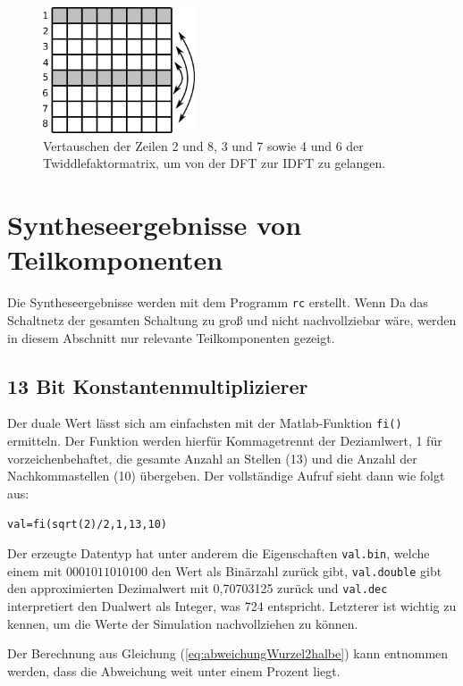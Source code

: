 \begin{figure}[ht]
 \centering
 \includegraphics[width=0.4\textwidth]{img/IDFT_Zeilentausch.png}
 \caption{Vertauschen der Zeilen 2 und 8, 3 und 7 sowie 4 und 6 der Twiddlefaktormatrix, um von der DFT zur IDFT zu gelangen.}
 \label{pic:IDFT_Zeilentausch}
\end{figure}




\section{Syntheseergebnisse von Teilkomponenten}\label{sec:Syntheseergebnisse}
Die Syntheseergebnisse werden mit dem Programm \texttt{rc} erstellt. Wenn 
Da das Schaltnetz der gesamten Schaltung zu groß und nicht nachvollziebar wäre, werden in diesem Abschnitt nur relevante Teilkomponenten gezeigt.

\subsection{13 Bit Konstantenmultiplizierer}\label{sec:Konstantenmultiplizierer}

Der duale Wert lässt sich am einfachsten mit der Matlab-Funktion \texttt{fi()} ermitteln. Der Funktion werden hierfür Kommagetrennt der Deziamlwert, 1 für vorzeichenbehaftet,
die gesamte Anzahl an Stellen (13) und die Anzahl der Nachkommastellen (10) übergeben. Der vollständige Aufruf sieht dann wie folgt aus:

\texttt{val=fi(sqrt(2)/2,1,13,10)}

Der erzeugte Datentyp hat unter anderem die Eigenschaften \texttt{val.bin}, welche einem mit $0001011010100$ den Wert als Binärzahl zurück gibt, 
\texttt{val.double} gibt den approximierten Dezimalwert mit 0,70703125 zurück und \texttt{val.dec} interpretiert den Dualwert als Integer, was 724 entspricht.
Letzterer ist wichtig zu kennen, um die Werte der Simulation nachvollziehen zu können.

Der Berechnung aus Gleichung (\ref{eq:abweichungWurzel2halbe}) kann entnommen werden, dass die Abweichung weit unter einem Prozent liegt.

